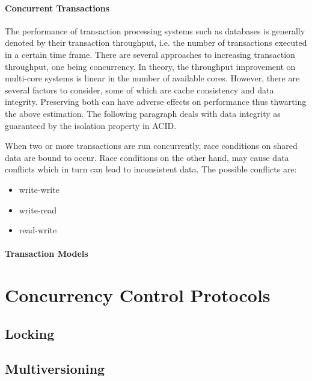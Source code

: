\paragraph{Concurrent Transactions}

The performance of transaction processing systems such as databases is generally
denoted by their transaction throughput, i.e. the number of transactions
executed in a certain time frame. There are several approaches to increasing
transaction throughput, one being concurrency. In theory, the throughput
improvement on multi-core systems is linear in the number of available cores.
However, there are several factors to consider, some of which are cache
consistency and data integrity. Preserving both can have adverse effects on
performance thus thwarting the above estimation. The following paragraph deals
with data integrity as guaranteed by the isolation property in ACID.

When two or more transactions are run concurrently, race conditions on shared
data are bound to occur. Race conditions on the other hand, may cause data
conflicts which in turn can lead to inconsistent data. The possible conflicts
are:

\begin{itemize}
    \item write-write
    \item write-read
    \item read-write
\end{itemize}


\paragraph{Transaction Models}


\section{Concurrency Control Protocols}

\subsection{Locking}

\subsection{Multiversioning}

